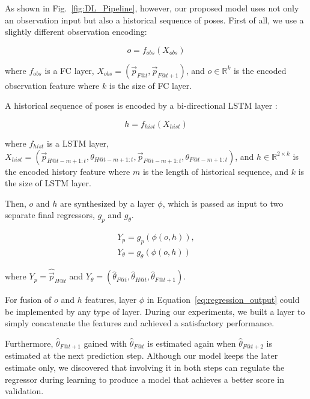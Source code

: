 \documentclass[letterpaper, 10 pt, conference]{ieeeconf}  %
\begin{document}
	As shown in Fig.~\ref{fig:DL_Pipeline}, however, our proposed model uses not only 
	an observation input but also a historical sequence of poses. First of all, we 
	use a slightly different observation encoding: 

	\begin{equation}
	o = f_{obs}(X_{obs})
	\end{equation}

	where $f_{obs}$ is a FC layer,
		$X_{obs} = (\vec{p}_{F@t}, \vec{p}_{F@t+1})$, 
		and $o \in \mathbb{R}^{k}$ is the encoded observation feature 
		where $k$ is the size of FC layer. 
		
	A historical sequence of poses is encoded by a bi-directional LSTM layer \cite{Wu16}: 

	\begin{equation}
	h = f_{hist}(X_{hist})
	\end{equation}


     where $f_{hist}$ is a LSTM layer,	
		$X_{hist} = (\vec{p}_{H@t-m+1:t}, \theta_{H@t-m+1:t},
		             \vec{p}_{F@t-m+1:t}, \theta_{F@t-m+1:t})$,		
		and $h \in \mathbb{R}^{2 \times k}$ is the encoded history feature
	where $m$ is the length of historical sequence, 
	and $k$ is the size of LSTM layer. 

	Then, $o$ and $h$ are synthesized by a layer $\phi$, which is 
	passed as input to two separate final regressors, $g_{p}$ and $g_\theta$.  
	
	\begin{equation}
	\begin{split}
	Y_{p} = g_{p}(\phi(o, h)),\\
	Y_{\theta}= g_{\theta}(\phi(o, h)) 
	\end{split}
	\label{eq:regression_output}
	\end{equation}
	
	where 
	$Y_{p} = \hat{\vec{p}}_{H@t}$ and
	$Y_{\theta} = (\hat{\theta}_{F@t}, \hat{\theta}_{H@t}, \hat{\theta}_{F@t+1})$.
	
	For fusion of $o$ and $h$ features, layer $\phi$ in Equation~\ref{eq:regression_output} 
	could be implemented by any type of layer. During our experiments, we 
	built a layer to simply concatenate the features and achieved a satisfactory 
	performance. 
	
	Furthermore, $\hat{\theta}_{F@t+1}$ gained with $\hat{\theta}_{F@t}$ is
	estimated again when $\hat{\theta}_{F@t+2}$ is estimated at the next 
	prediction step. Although our model keeps the later estimate only, 
	we discovered that involving it in both steps can regulate the regressor 
	during learning to produce a model that achieves a better score in validation. 
	
\end{document}
